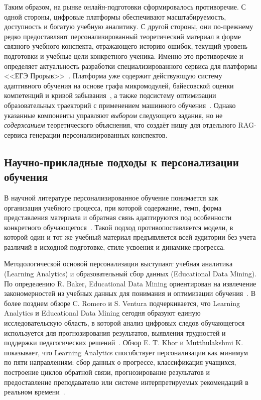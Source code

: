 \documentclass[a4paper,12pt]{extarticle}
\begin{document}
Таким образом, на рынке онлайн-подготовки сформировалось противоречие. С одной стороны, цифровые платформы 
обеспечивают масштабируемость, доступность и богатую учебную аналитику. С другой стороны, они по-прежнему 
редко предоставляют персонализированный теоретический материал в форме связного учебного конспекта, отражающего 
историю ошибок, текущий уровень подготовки и учебные цели конкретного ученика. Именно это противоречие и 
определяет актуальность разработки специализированного сервиса для платформы 
<<ЕГЭ Прорыв>>~\cite{exambreakout2026}. Платформа уже содержит действующую систему
адаптивного обучения на основе графа микромодулей, байесовской оценки компетенций и
кривой забывания~\cite{tarasov2025adaptive}, а также подсистему оптимизации
образовательных траекторий с применением машинного обучения~\cite{agarev2025trajectories}.
Однако указанные компоненты управляют \textit{выбором} следующего задания, но не
\textit{содержанием} теоретического объяснения, что создаёт нишу для отдельного
RAG-сервиса генерации персонализированных конспектов.

\subsection{Научно-прикладные подходы к персонализации обучения}

В научной литературе персонализированное обучение понимается как организация учебного процесса, при которой 
содержание, темп, форма представления материала и обратная связь адаптируются под особенности конкретного 
обучающегося~\cite{khor2024la}. Такой подход противопоставляется модели, в которой один 
и тот же учебный материал предъявляется всей аудитории без учета различий в исходной подготовке, стиле усвоения 
и динамике прогресса.

Методологической основой персонализации выступают учебная аналитика (Learning Analytics) и образовательный сбор данных 
(Educational Data Mining). По определению 
R. Baker, Educational Data Mining ориентирован на извлечение закономерностей из учебных данных для понимания 
и оптимизации обучения~\cite{baker2010edm}. В более позднем обзоре C. Romero и S. Ventura подчеркивается, 
что Learning Analytics и Educational Data Mining сегодня образуют единую исследовательскую область, 
в которой анализ цифровых следов обучающегося используется для прогнозирования результатов, выявления трудностей 
и поддержки педагогических решений~\cite{romero2020edm}. Обзор E. T. Khor и Mutthulakshmi K. 
показывает, что Learning Analytics способствует персонализации как минимум по пяти направлениям: сбор 
данных о прогрессе, классификация учащихся, построение циклов обратной связи, прогнозирование результатов 
и предоставление преподавателю или системе интерпретируемых рекомендаций в реальном времени~\cite{khor2024la}.
\end{document}
